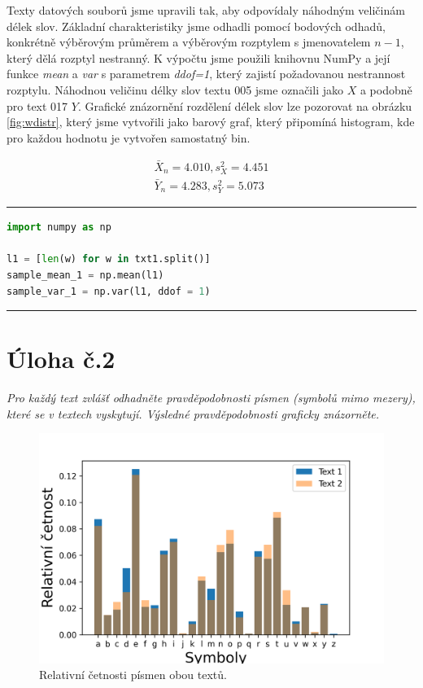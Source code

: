 \documentclass[czech]{mvi-report}
\begin{document}
Texty datových souborů jsme upravili tak, aby odpovídaly náhodným veličinám délek slov. Základní charakteristiky jsme odhadli pomocí bodových odhadů, konkrétně výběrovým průměrem a výběrovým rozptylem s jmenovatelem $ n-1 $, který dělá rozptyl nestranný. K výpočtu jsme použili knihovnu NumPy a její funkce \textit{mean} a \textit{var} s parametrem \textit{ddof=1}, který zajistí požadovanou nestrannost rozptylu. Náhodnou veličinu délky slov textu 005 jsme označili jako $ X $ a podobně pro text 017 $ Y $. Grafické znázornění rozdělení délek slov lze pozorovat na obrázku \ref{fig:wdistr}, který jsme vytvořili jako barový graf, který připomíná histogram, kde pro každou hodnotu je vytvořen samostatný bin.

\begin{align*}
\bar{X}_n = 4.010, s_X^2=4.451\\ 
\bar{Y}_n = 4.283, s_Y^2=5.073
\end{align*}

\noindent\rule{\columnwidth}{1pt}
\begin{lstlisting}[language=Python]
import numpy as np

l1 = [len(w) for w in txt1.split()]
sample_mean_1 = np.mean(l1)
sample_var_1 = np.var(l1, ddof = 1)
\end{lstlisting}
\noindent\rule{\columnwidth}{1pt}

\section{Úloha č.2}
\textit{Pro každý text zvlášť odhadněte pravděpodobnosti písmen (symbolů mimo mezery), které se v textech vyskytují. Výsledné pravděpodobnosti graficky znázorněte.}\\

\begin{figure}
\includegraphics[width=1\columnwidth]{img/chdistr.png} 
\caption{Relativní četnosti písmen obou textů.}
\label{fig:chdistr}
\end{figure}
\end{document}

